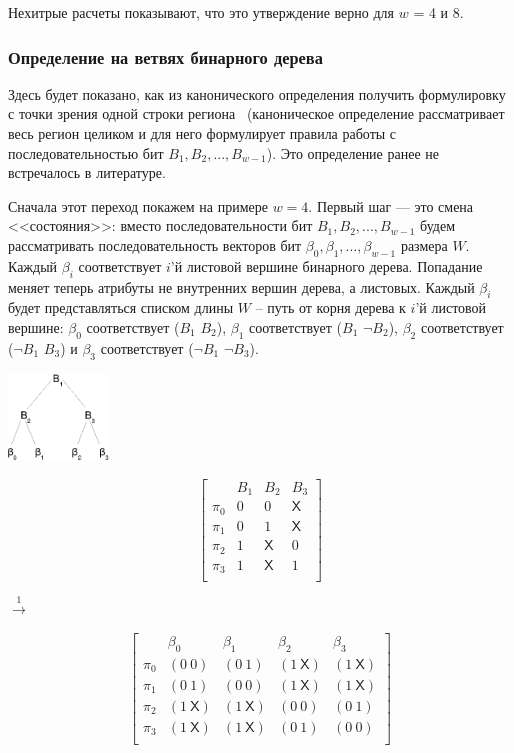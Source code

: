 Нехитрые расчеты показывают, что это утверждение верно для $w$ = 4 и 8.

\subsubsection{Определение \PseudoLRU на ветвях бинарного
дерева}\label{sec:PseudoLRUonBranches}

Здесь будет показано, как из канонического определения \PseudoLRU
получить формулировку \PseudoLRU с точки зрения одной строки региона~\cite{my_lomonosov_2010}
(каноническое определение рассматривает весь регион целиком и
для него формулирует правила работы с последовательностью бит $B_1,
B_2, ..., B_{w{-}1}$). Это определение ранее не встречалось в
литературе.

Сначала этот переход покажем на примере $w=4$. Первый шаг --- это
смена <<состояния>>: вместо последовательности бит $B_1, B_2, ...,
B_{w-1}$ будем рассматривать последовательность векторов бит
$\beta_0, \beta_1, \dots, \beta_{w-1}$ размера $W$. Каждый $\beta_i$
соответствует $i$'й листовой вершине бинарного дерева. Попадание
меняет теперь атрибуты не внутренних вершин дерева, а листовых.
Каждый $\beta_i$ будет представляться списком длины $W$ -- путь от
корня дерева к $i$'й листовой вершине: $\beta_0$ соответствует
($B_1$ $B_2$), $\beta_1$ соответствует ($B_1$ $\neg B_2$), $\beta_2$
соответствует ($\neg B_1$ $B_3$) и $\beta_3$ соответствует ($\neg
B_1$ $ \neg B_3$).\\[0.5cm]

\parbox{0.2\textwidth}{ \centering
  \includegraphics[width=0.2\textwidth]{1.review/btree}
}
\parbox{0.25\textwidth}{
$$ \left[
  \begin{array}{c|ccc}
          & B_1 & B_2 & B_3 \\ \hline
    \pi_0 & 0 & 0 & \textsf{X} \\
    \pi_1 & 0 & 1 & \textsf{X} \\
    \pi_2 & 1 & \textsf{X} & 0 \\
    \pi_3 & 1 & \textsf{X} & 1 \\
  \end{array}
\right]
$$
} $\stackrel{1}{\longrightarrow}$ %
\parbox{0.4\textwidth}{
$$ \left[
  \begin{array}{c|cccc}
          & \beta_0 & \beta_1 & \beta_2 & \beta_3 \\ \hline
    \pi_0 & (0~0) & (0~1) & (1~\textsf{X}) & (1~\textsf{X}) \\
    \pi_1 & (0~1) & (0~0) & (1~\textsf{X}) & (1~\textsf{X}) \\
    \pi_2 & (1~\textsf{X}) & (1~\textsf{X}) & (0~0) & (0~1) \\
    \pi_3 & (1~\textsf{X}) & (1~\textsf{X}) & (0~1) & (0~0) \\
  \end{array}
\right]
$$
}

